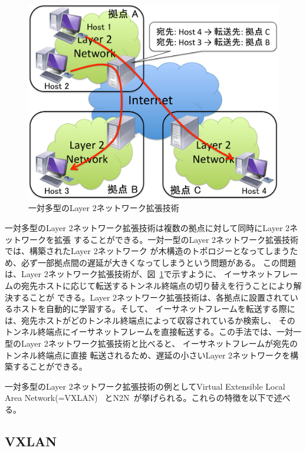 \begin{figure}
	\begin{center}
		\includegraphics[scale=0.50]{./img/1tomulti}
		\caption{一対多型のLayer 2ネットワーク拡張技術}
		\label{img:1tomulti}
	\end{center}
\end{figure}

一対多型のLayer 2ネットワーク拡張技術は複数の拠点に対して同時にLayer 2ネットワークを拡張
することができる。一対一型のLayer 2ネットワーク拡張技術では、構築されたLayer 2ネットワーク
が木構造のトポロジーとなってしまうため、必ず一部拠点間の遅延が大きくなってしまうという問題がある。
この問題は、Layer 2ネットワーク拡張技術が、図~\ref{img:1tomulti}で示すように、
イーサネットフレームの宛先ホストに応じて転送するトンネル終端点の切り替えを行うことにより解決することが
できる。Layer 2ネットワーク拡張技術は、各拠点に設置されているホストを自動的に学習する。そして、
イーサネットフレームを転送する際には、宛先ホストがどのトンネル終端点によって収容されているか検索し、
そのトンネル終端点にイーサネットフレームを直接転送する。この手法では、一対一型のLayer 2ネットワーク拡張技術と比べると、
イーサネットフレームが宛先のトンネル終端点に直接
転送されるため、遅延の小さいLayer 2ネットワークを構築することができる。

一対多型のLayer 2ネットワーク拡張技術の例としてVirtual Extensible Local Area Network(=VXLAN)~\cite{id:vxlan}
とN2N~\cite{n2n}が挙げられる。これらの特徴を以下で述べる。

\subsection{VXLAN}
\label{rw:vxlan}

